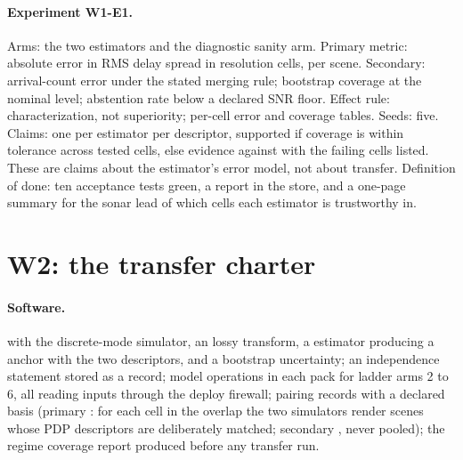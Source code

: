 \documentclass[11pt,a4paper]{article}
\begin{document}
\paragraph{Experiment W1-E1.} Arms: the two estimators and the diagnostic sanity arm. Primary metric: absolute error in RMS delay spread in resolution cells, per scene. Secondary: arrival-count error under the stated merging rule; bootstrap coverage at the nominal level; abstention rate below a declared SNR floor. Effect rule: characterization, not superiority; per-cell error and coverage tables. Seeds: five. Claims: one per estimator per descriptor, supported if coverage is within tolerance across tested cells, else evidence against with the failing cells listed. These are claims about the estimator's error model, not about transfer. Definition of done: ten acceptance tests green, a report in the store, and a one-page summary for the sonar lead of which cells each estimator is trustworthy in.

\section{W2: the transfer charter}

\paragraph{Software.}  with the discrete-mode simulator, an  lossy transform, a  estimator producing a  anchor with the two descriptors, and a bootstrap uncertainty; an independence statement stored as a record; model operations in each pack for ladder arms 2 to 6, all reading inputs through the deploy firewall; pairing records with a declared basis (primary : for each cell in the overlap the two simulators render scenes whose PDP descriptors are deliberately matched; secondary , never pooled); the regime coverage report produced before any transfer run.
\end{document}
